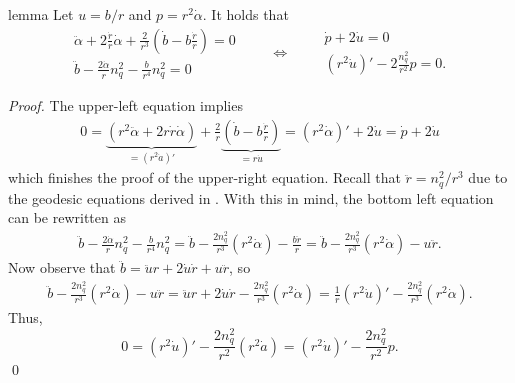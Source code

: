 \documentclass[11pt]{article}
\begin{document}
\begin{restatable}{lemma}{} \label{lemma: parallel jacobi equation}
    Let $u = b/r$ and $p = r^2\dot \alpha$. It holds that
    \begin{equation*}
        \begin{aligned}
            \ddot \alpha + 2\frac{\dot r}{r}\dot \alpha + \frac{2}{r^3}\left(\dot b - b\frac{ \dot r}{r}\right) = 0 \\
            \ddot b - \frac{2\dot \alpha}{r}n_q^2 - \frac{b}{r^4} n_q^2 = 0
        \end{aligned}\qquad  \iff \qquad 
        \begin{aligned}
            \dot p + 2\dot u = 0\, \\
            (r^2\dot u)' - 2\frac{n_q^2}{r^2}p = 0.
        \end{aligned}
    \end{equation*}
\end{restatable}
\noindent \textit{Proof.} The upper-left equation implies
\begin{align*}
    0 = \underbrace{(r^2\ddot 
    \alpha+ 2r\dot r\dot \alpha)}_{ = (r^2\dot a)'} + \frac{2}{r}\underbrace{\left(\dot b - b\frac{ \dot r}{r}\right)}_{ = r\dot u} = (r^2\dot \alpha)' + 2\dot u = \dot p + 2\dot u
\end{align*}
which finishes the proof of the upper-right equation. Recall that $\ddot r = n_q^2/r^3$ due to the geodesic equations derived in . With this in mind, the bottom left equation can be rewritten as 
\begin{align*}
    \ddot b - \frac{2\dot \alpha}{r}n_q^2 - \frac{b}{r^4} n_q^2 = \ddot b   - \frac{2n_q^2}{r^3}(r^2\dot \alpha)- \frac{b\ddot r}{r} = \ddot b  - \frac{2n_q^2}{r^3}(r^2\dot \alpha) - u\ddot r.
\end{align*}
Now observe that $\ddot b = \ddot u r + 2\dot u \dot r + u\ddot r$, so 
\begin{align*}
    \ddot b - \frac{2n_q^2}{r^3}(r^2\dot \alpha)  - u\ddot r = \ddot u r  + 2\dot u \dot r - \frac{2n_q^2}{r^3}(r^2\dot \alpha) = \frac{1}{r}(r^2\dot u)' - \frac{2n_q^2}{r^3}(r^2\dot \alpha).
\end{align*}
Thus,
\begin{equation*}
    0 = (r^2\dot u)' - \frac{2n_q^2}{r^2}(r^2\dot a) = (r^2\dot u)' - \frac{2n_q^2}{r^2}p.
\end{equation*} \qed{}
\end{document}
